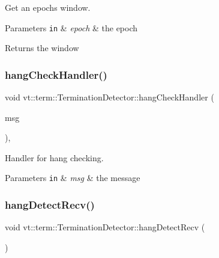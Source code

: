 Get an epoch\textquotesingle{}s window. 


\begin{DoxyParams}[1]{Parameters}
\mbox{\tt in}  & {\em epoch} & the epoch\\
\hline
\end{DoxyParams}
\begin{DoxyReturn}{Returns}
the window 
\end{DoxyReturn}
\mbox{\label{structvt_1_1term_1_1_termination_detector_af9fd292c8d1bcc5eba9ee1fb39c29ea2}} 
\subsubsection{\texorpdfstring{hang\+Check\+Handler()}{hangCheckHandler()}}
{\footnotesize\ttfamily void vt\+::term\+::\+Termination\+Detector\+::hang\+Check\+Handler (\begin{DoxyParamCaption}\item[{\hyperlink{structvt_1_1term_1_1_hang_check_msg}{Hang\+Check\+Msg} $\ast$}]{msg }\end{DoxyParamCaption})\hspace{0.3cm}{\ttfamily [static]}, {\ttfamily [private]}}



Handler for hang checking. 


\begin{DoxyParams}[1]{Parameters}
\mbox{\tt in}  & {\em msg} & the message \\
\hline
\end{DoxyParams}
\mbox{\label{structvt_1_1term_1_1_termination_detector_ad9b79c662481216d0bb70f81b12dfbf8}} 
\subsubsection{\texorpdfstring{hang\+Detect\+Recv()}{hangDetectRecv()}}
{\footnotesize\ttfamily void vt\+::term\+::\+Termination\+Detector\+::hang\+Detect\+Recv (\begin{DoxyParamCaption}{ }\end{DoxyParamCaption})\hspace{0.3cm}{\ttfamily [inline]}}



